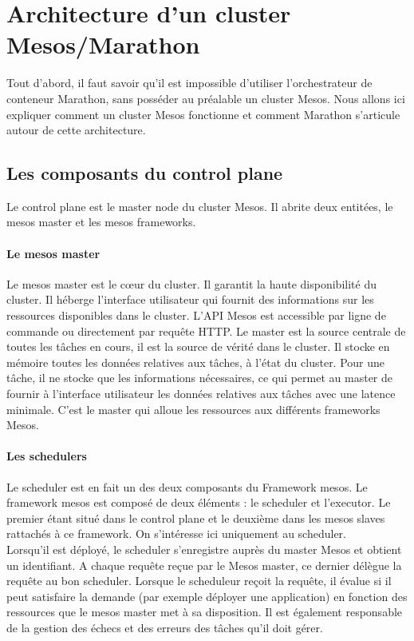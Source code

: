 \documentclass[11pt,fleqn]{book} %
\begin{document}
\section{Architecture d'un cluster Mesos/Marathon}
Tout d'abord, il faut savoir qu'il est impossible d'utiliser l'orchestrateur de conteneur Marathon, sans posséder au préalable un cluster Mesos. Nous allons ici expliquer comment un cluster Mesos fonctionne et comment Marathon s'articule autour de cette architecture.



\subsection{Les composants du control plane}
Le control plane est le master node du cluster Mesos. Il abrite deux entitées, le mesos master et les mesos frameworks.
\paragraph{Le mesos master}
Le mesos master est le cœur du cluster. Il garantit la haute disponibilité du cluster. Il héberge l'interface utilisateur qui fournit des informations sur les ressources disponibles dans le cluster. L'API Mesos est accessible par ligne de commande ou directement par requête HTTP. Le master est la source centrale de toutes les tâches en cours, il est la source de vérité dans le cluster. Il stocke en mémoire toutes les données relatives aux tâches, à l'état du cluster. Pour une tâche, il ne stocke que les informations nécessaires, ce qui permet au master de fournir à l'interface utilisateur les données relatives aux tâches avec une latence minimale. C'est le master qui alloue les ressources aux différents frameworks Mesos.

\paragraph{Les schedulers}
Le scheduler est en fait un des deux composants du Framework mesos. Le framework mesos est composé de deux éléments : le scheduler et l'executor. Le premier étant situé dans le control plane et le deuxième dans les mesos slaves rattachés à ce framework. On s'intéresse ici uniquement au scheduler. \\

Lorsqu'il est déployé, le scheduler s'enregistre auprès du master Mesos et obtient un identifiant. A chaque requête reçue par le Mesos master, ce dernier délègue la requête au bon scheduler. Lorsque le scheduleur reçoit la requête, il évalue si il peut satisfaire la demande (par exemple déployer une application) en fonction des ressources que le mesos master met à sa disposition. Il est également responsable de la gestion des échecs et des erreurs des tâches qu'il doit gérer. \\
\end{document}
